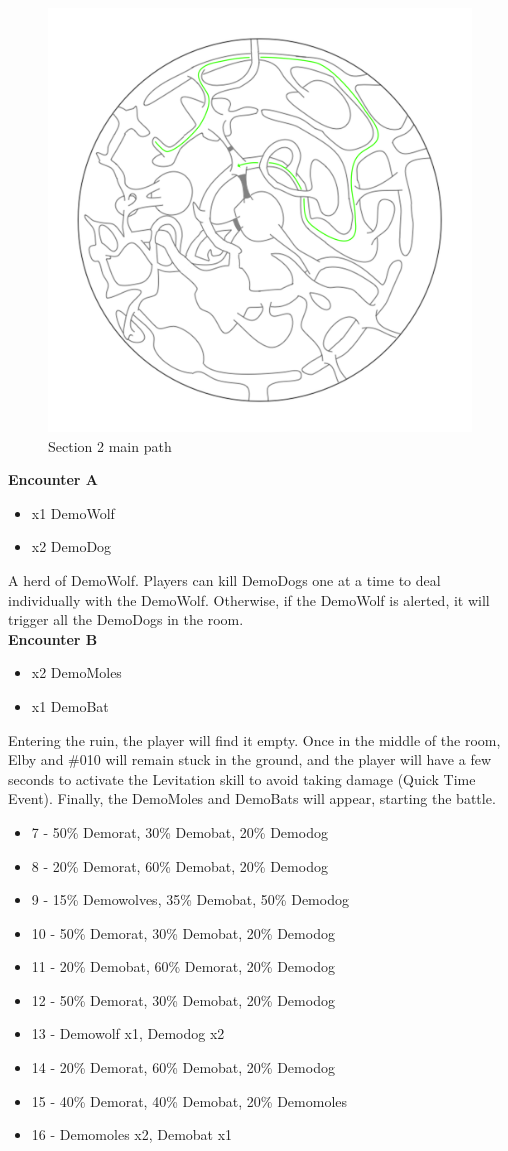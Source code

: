 \begin{figure}[H]
	\centering
	\includegraphics[width=0.7\linewidth]{images/map/map_principle_path_section_02.png}
	\caption*{Section 2 main path}
\end{figure}

\textbf{Encounter A}
\begin{itemize}
	\item x1 DemoWolf
	\item x2 DemoDog
\end{itemize}
A herd of DemoWolf. Players can kill DemoDogs one at a time to deal individually with the DemoWolf. Otherwise, if the DemoWolf is alerted, it will trigger all the DemoDogs in the room.\\

\textbf{Encounter B}
\begin{itemize}
	\item x2 DemoMoles
	\item x1 DemoBat
\end{itemize}
Entering the ruin, the player will find it empty. Once in the middle of the room, Elby and \#010 will remain stuck in the ground, and the player will have a few seconds to activate the Levitation skill to avoid taking damage (Quick Time Event). Finally, the DemoMoles and DemoBats will appear, starting the battle.

\begin{itemize}
	\item 7 - 50\% Demorat, 30\% Demobat, 20\% Demodog
	\item 8 - 20\% Demorat, 60\% Demobat, 20\% Demodog
	\item 9 - 15\% Demowolves, 35\% Demobat, 50\% Demodog
	\item 10 - 50\% Demorat, 30\% Demobat, 20\% Demodog
	\item 11 - 20\% Demobat, 60\% Demorat, 20\% Demodog
	\item 12 - 50\% Demorat, 30\% Demobat, 20\% Demodog
	\item 13 - Demowolf x1, Demodog x2
	\item 14 - 20\% Demorat, 60\% Demobat, 20\% Demodog
	\item 15 - 40\% Demorat, 40\% Demobat, 20\% Demomoles
	\item 16 - Demomoles x2, Demobat x1
\end{itemize}


